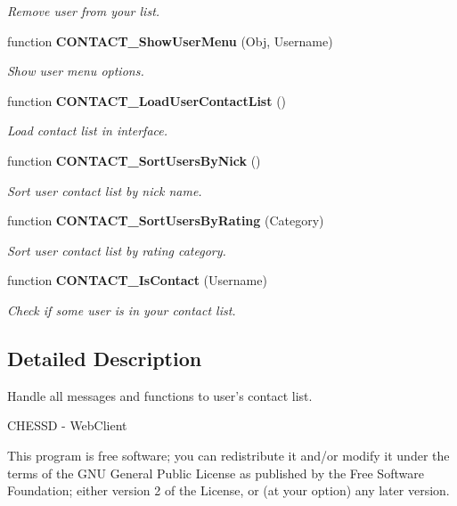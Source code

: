 \begin{CompactItemize}
\begin{CompactList}\small\item\em Remove user from your list. \item\end{CompactList}\item 
function {\bf CONTACT\_\-ShowUserMenu} (Obj, Username)
\begin{CompactList}\small\item\em Show user menu options. \item\end{CompactList}\item 
function {\bf CONTACT\_\-LoadUserContactList} ()
\begin{CompactList}\small\item\em Load contact list in interface. \item\end{CompactList}\item 
function {\bf CONTACT\_\-SortUsersByNick} ()
\begin{CompactList}\small\item\em Sort user contact list by nick name. \item\end{CompactList}\item 
function {\bf CONTACT\_\-SortUsersByRating} (Category)
\begin{CompactList}\small\item\em Sort user contact list by rating category. \item\end{CompactList}\item 
function {\bf CONTACT\_\-IsContact} (Username)
\begin{CompactList}\small\item\em Check if some user is in your contact list. \item\end{CompactList}\end{CompactItemize}


\subsection{Detailed Description}
Handle all messages and functions to user's contact list. 

CHESSD - WebClient

This program is free software; you can redistribute it and/or modify it under the terms of the GNU General Public License as published by the Free Software Foundation; either version 2 of the License, or (at your option) any later version.

